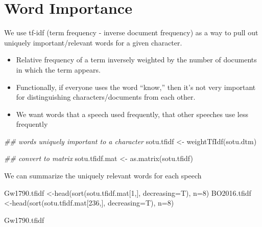 \documentclass[
  letterpaper,
  DIV=11,
  numbers=noendperiod]{scrreprt}
\newenvironment{Shaded}{\begin{snugshade}}{\end{snugshade}}
\newcommand{\AttributeTok}[1]{\textcolor[rgb]{0.40,0.45,0.13}{#1}}
\newcommand{\DecValTok}[1]{\textcolor[rgb]{0.68,0.00,0.00}{#1}}
\newcommand{\DocumentationTok}[1]{\textcolor[rgb]{0.37,0.37,0.37}{\textit{#1}}}
\newcommand{\FunctionTok}[1]{\textcolor[rgb]{0.28,0.35,0.67}{#1}}
\newcommand{\NormalTok}[1]{\textcolor[rgb]{0.00,0.23,0.31}{#1}}
\newcommand{\OtherTok}[1]{\textcolor[rgb]{0.00,0.23,0.31}{#1}}
\providecommand{\tightlist}{%
  \setlength{\itemsep}{0pt}\setlength{\parskip}{0pt}}\usepackage{longtable,booktabs,array}
\begin{document}
\hypertarget{word-importance}{%
\section{Word Importance}\label{word-importance}}

We use tf-idf (term frequency - inverse document frequency) as a way to
pull out uniquely important/relevant words for a given character.

\begin{itemize}
\tightlist
\item
  Relative frequency of a term inversely weighted by the number of
  documents in which the term appears.
\item
  Functionally, if everyone uses the word ``know,'' then it's not very
  important for distinguishing characters/documents from each other.
\item
  We want words that a speech used frequently, that other speeches use
  less frequently
\end{itemize}

\begin{Shaded}
\begin{Highlighting}[]
\DocumentationTok{\#\# words uniquely important to a character}
\NormalTok{sotu.tfidf }\OtherTok{\textless{}{-}} \FunctionTok{weightTfIdf}\NormalTok{(sotu.dtm)}

\DocumentationTok{\#\# convert to matrix}
\NormalTok{sotu.tfidf.mat }\OtherTok{\textless{}{-}} \FunctionTok{as.matrix}\NormalTok{(sotu.tfidf)}
\end{Highlighting}
\end{Shaded}

We can summarize the uniquely relevant words for each speech

\begin{Shaded}
\begin{Highlighting}[]
\NormalTok{Gw1790.tfidf }\OtherTok{\textless{}{-}}\FunctionTok{head}\NormalTok{(}\FunctionTok{sort}\NormalTok{(sotu.tfidf.mat[}\DecValTok{1}\NormalTok{,], }\AttributeTok{decreasing=}\NormalTok{T), }\AttributeTok{n=}\DecValTok{8}\NormalTok{)}
\NormalTok{BO2016.tfidf }\OtherTok{\textless{}{-}}\FunctionTok{head}\NormalTok{(}\FunctionTok{sort}\NormalTok{(sotu.tfidf.mat[}\DecValTok{236}\NormalTok{,], }\AttributeTok{decreasing=}\NormalTok{T), }\AttributeTok{n=}\DecValTok{8}\NormalTok{)}
\end{Highlighting}
\end{Shaded}

\begin{Shaded}
\begin{Highlighting}[]
\NormalTok{Gw1790.tfidf}
\end{Highlighting}
\end{Shaded}
\end{document}
